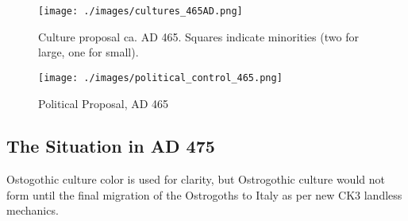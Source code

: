 \documentclass{article}
\begin{document}
	\newpage
	
	\begin{figure}[h!]
		\centering
		\texttt{[image: ./images/cultures\_465AD.png]}
		\caption{Culture proposal ca. AD 465. Squares indicate minorities (two for large, one for small).}
	\end{figure}
	
	\begin{figure}[h!]
		\centering
		\texttt{[image: ./images/political\_control\_465.png]}
		\caption{Political Proposal, AD 465}
	\end{figure}
	
	\newpage
	
	\subsection{The Situation in AD 475}
	\label{sec:timeline:subsec:475}
	Ostogothic culture color is used for clarity, but Ostrogothic culture would not form until the final migration of the Ostrogoths to Italy as per new CK3 landless mechanics.
	
\end{document}
